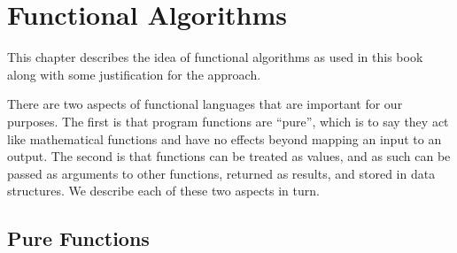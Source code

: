 \chapter{Functional Algorithms}
\label{ch:language::functional-algorithms}

\begin{cluster}
\label{grp:prmbl:language::functional-algorithms::describes}

\begin{preamble}
\label{prmbl:language::functional-algorithms::describes}
This chapter describes the idea of functional algorithms as used in
this book along with some justification for the approach.

\end{preamble}
\end{cluster}

\begin{cluster}
\label{grp:grm:language::functional-algorithms::aspects}

\begin{gram}
\label{grm:language::functional-algorithms::aspects}
There are two aspects of functional languages that are important for
our purposes.   The first is that program functions are ``pure'',
which is to say they act like mathematical functions and have no
effects beyond mapping an input to an output.    The second is that
functions can be treated as values, and as such can be passed as
arguments to other functions, returned as results, and stored in data
structures.  We describe each of these two aspects in turn.

\end{gram}
\end{cluster}


\section{Pure Functions}
\label{sec:language::functional-algorithms::pure-functions}


